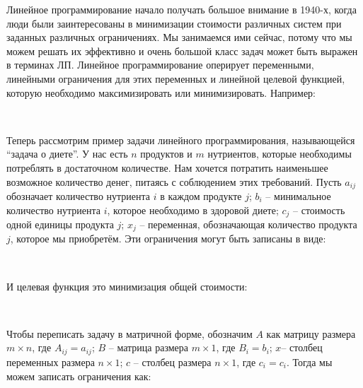 
\graphicspath{ {imgs/} }






Линейное программирование начало получать большое внимание в 1940-х, когда люди были заинтересованы в минимизации стоимости различных систем при заданных различных ограничениях. Мы занимаемся ими сейчас, потому что мы можем решать их эффективно и очень большой класс задач может быть выражен в терминах ЛП. Линейное программирование оперирует переменными, линейными ограничения для этих переменных и линейной целевой функцией, которую необходимо максимизировать или минимизировать. Например:

\

Теперь рассмотрим пример задачи линейного программирования, называющейся ``задача о диете''. У нас есть $n$ продуктов и $m$ нутриентов, которые необходимы потреблять в достаточном количестве. Нам хочется потратить наименьшее возможное количество денег, питаясь с соблюдением этих требований. Пусть $a_{ij}$ обозначает количество нутриента $i$ в каждом продукте $j$; $b_i$ -- минимальное количество нутриента $i$, которое необходимо в здоровой диете; $c_j$ -- стоимость одной единицы продукта $j$; $x_j$ -- переменная, обозначающая количество продукта $j$, которое мы приобретём. Эти ограничения могут быть записаны в виде:

\

И целевая функция это минимизация общей стоимости:

\

Чтобы переписать задачу в матричной форме, обозначим $A$ как матрицу размера $m \times n$, где $A_{ij} = a_{ij}$; $B$ -- матрица размера $m \times 1$, где $B_i = b_i$; $x$-- столбец переменных размера $n \times 1$; $c$ -- столбец размера $n \times 1$, где $c_i = c_i$. Тогда мы можем записать ограничения как:

